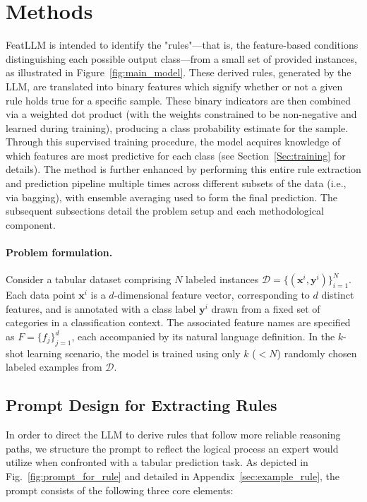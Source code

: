 \section{Methods}
\textsf{FeatLLM} is intended to identify the "rules"—that is, the feature-based conditions distinguishing each possible output class—from a small set of provided instances, as illustrated in Figure~\ref{fig:main_model}. These derived rules, generated by the LLM, are translated into binary features which signify whether or not a given rule holds true for a specific sample. These binary indicators are then combined via a weighted dot product (with the weights constrained to be non-negative and learned during training), producing a class probability estimate for the sample. Through this supervised training procedure, the model acquires knowledge of which features are most predictive for each class (see Section~\ref{Sec:training} for details). The method is further enhanced by performing this entire rule extraction and prediction pipeline multiple times across different subsets of the data (i.e., via bagging), with ensemble averaging used to form the final prediction. The subsequent subsections detail the problem setup and each methodological component.

\vspace*{-0.12in}
\paragraph{Problem formulation.} Consider a tabular dataset comprising $N$ labeled instances $\mathcal{D} = \{(\mathbf{x}^i, \mathbf{y}^i)\}_{i=1}^{N}$. Each data point $\mathbf{x}^i$ is a $d$-dimensional feature vector, corresponding to $d$ distinct features, and is annotated with a class label $\mathbf{y}^i$ drawn from a fixed set of categories in a classification context. The associated feature names are specified as $F = \{f_j\}_{j=1}^{d}$, each accompanied by its natural language definition. In the $k$-shot learning scenario, the model is trained using only $k$ ($<N$) randomly chosen labeled examples from $\mathcal{D}$.

\subsection{Prompt Design for Extracting Rules}
\label{Sec:prompt_design}
In order to direct the LLM to derive rules that follow more reliable reasoning paths, we structure the prompt to reflect the logical process an expert would utilize when confronted with a tabular prediction task. As depicted in Fig.~\ref{fig:prompt_for_rule} and detailed in Appendix~\ref{sec:example_rule}, the prompt consists of the following three core elements:

